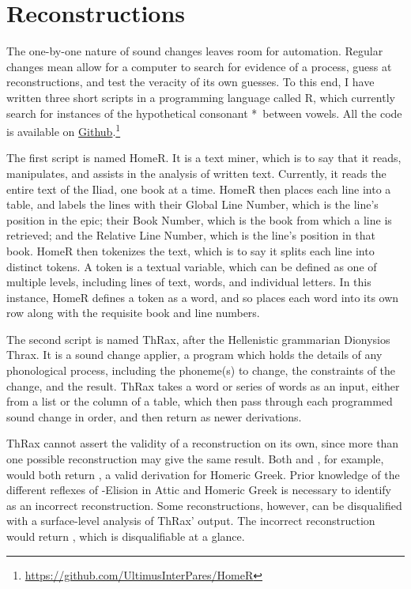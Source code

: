 \section{Reconstructions}\label{sec:Recon}
The one-by-one nature of sound changes leaves room for automation. Regular changes mean allow for a computer to search for evidence of a process, guess at reconstructions, and test the veracity of its own guesses.  To this end, I have written three short scripts in a programming language called R, which currently search for instances of the hypothetical consonant *\w\ between vowels. All the code is available on \href{https://github.com/UltimusInterPares/HomeR}{Github}.\footnote{\url{https://github.com/UltimusInterPares/HomeR}}

The first script is named HomeR. It is a text miner, which is to say that it reads, manipulates, and assists in the analysis of written text. Currently, it reads the entire text of the Iliad, one book at a time. HomeR then places each line into a table, and labels the lines with their Global Line Number, which is the line's position in the epic; their Book Number, which is the book from which a line is retrieved; and the Relative Line Number, which is the line's position in that book. HomeR then tokenizes the text, which is to say it splits each line into distinct tokens. A token is a textual variable, which can be defined as one of multiple levels, including lines of text, words, and individual letters. In this instance, HomeR defines a token as a word, and so places each word into its own row along with the requisite book and line numbers.



The second script is named ThRax, after the Hellenistic grammarian Dionysios Thrax. It is a sound change applier, a program which holds the details of any phonological process, including the phoneme(s) to change, the constraints of the change, and the result. ThRax takes a word or series of words as an input, either from a list or the column of a table, which then pass through each programmed sound change in order, and then return as newer derivations. 

ThRax cannot assert the validity of a reconstruction on its own, since more than one possible reconstruction may give the same result. Both  and , for example, would both return , a valid derivation for Homeric Greek. Prior knowledge of the different reflexes of \W-Elision in Attic and Homeric Greek is necessary to identify  as an incorrect reconstruction. Some reconstructions, however, can be disqualified with a surface-level analysis of ThRax' output. The incorrect reconstruction  would return , which is disqualifiable at a glance.

